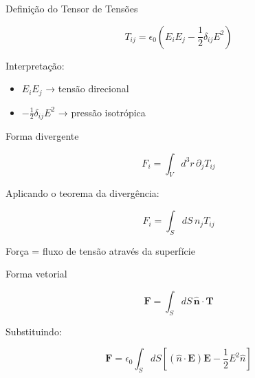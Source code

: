 \documentclass[aspectratio=169,11pt]{beamer}
\begin{document}
\begin{frame}{Definição do Tensor de Tensões}

\begin{eqbox}
\begin{equation}
T_{ij} = \epsilon_0
\left(
E_i E_j - \frac{1}{2}\delta_{ij}E^2
\right)
\label{eq:3.93}
\end{equation}
\end{eqbox}

\begin{mybox}
Interpretação:
\begin{itemize}
\item $E_i E_j$ → tensão direcional
\item $-\frac{1}{2}\delta_{ij}E^2$ → pressão isotrópica
\end{itemize}
\end{mybox}

\end{frame}

\begin{frame}{Forma divergente}

\begin{eqbox}
\begin{equation}
F_i = \int_V d^3r\, \partial_j T_{ij}
\end{equation}
\end{eqbox}

Aplicando o teorema da divergência:

\begin{eqbox}
\begin{equation}
F_i = \int_S dS\, n_j T_{ij}
\label{eq:3.94}
\end{equation}
\end{eqbox}

\begin{mybox}
Força = fluxo de tensão através da superfície
\end{mybox}

\end{frame}

\begin{frame}{Forma vetorial}

\begin{eqbox}
\begin{equation}
\mathbf F = \int_S dS\, \mathbf{\hat n}\cdot \mathbf T
\label{eq:3.96}
\end{equation}
\end{eqbox}

Substituindo:

\begin{eqbox}
\begin{equation}
\mathbf F =
\epsilon_0 \int_S dS
\left[
(\hat n \cdot \mathbf E)\mathbf E
- \frac{1}{2}E^2 \hat n
\right]
\label{eq:3.97}
\end{equation}
\end{eqbox}

\end{frame}
\end{document}
